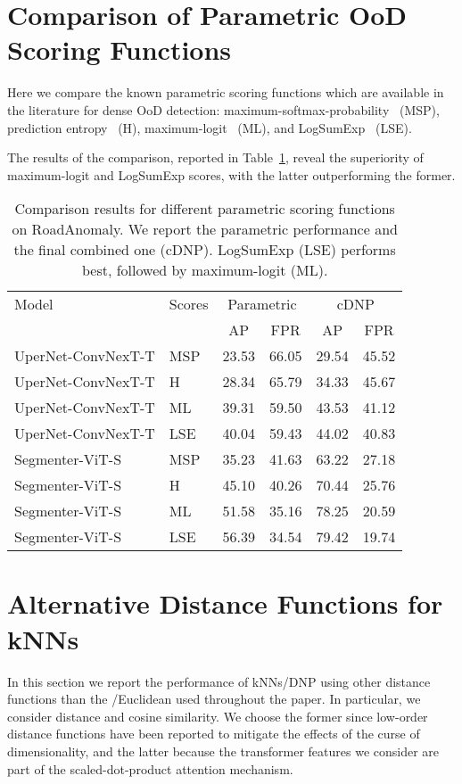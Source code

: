 \documentclass[10pt,twocolumn,letterpaper]{article}
\begin{document}
\section{Comparison of Parametric OoD Scoring Functions}
Here we compare the known parametric scoring functions which are available in the literature for dense OoD detection: maximum-softmax-probability~\cite{hendrycks2017a} (MSP), prediction entropy~\cite{hendrycks2019benchmark} (H), maximum-logit~\cite{hendrycks2019benchmark} (ML), and LogSumExp~\cite{Grathwohl2020Your,Tian2021} (LSE).

The results of the comparison, reported in Table~\ref{tab:parametric_scores}, reveal the superiority of maximum-logit and LogSumExp scores, with the latter outperforming the former.

\begin{table}
    \centering
    \scriptsize
    \begin{tabular}{l|l|c|c|c|c}
    \toprule
    Model & Scores & \multicolumn{2}{c|}{Parametric} & \multicolumn{2}{c}{cDNP} \\
    & & AP & FPR & AP & FPR \\
    \midrule
    UperNet-ConvNexT-T & MSP &  23.53 & 66.05 & 29.54 & 45.52 \\
    UperNet-ConvNexT-T & H &   28.34 & 65.79 & 34.33 & 45.67 \\
    UperNet-ConvNexT-T & ML &   39.31 & 59.50 & 43.53 & 41.12\\
    UperNet-ConvNexT-T & LSE &  40.04 & 59.43 & 44.02 & 40.83\\
    \midrule
    Segmenter-ViT-S & MSP &  35.23 & 41.63 & 63.22 & 27.18\\
    Segmenter-ViT-S & H &  45.10 & 40.26 & 70.44 & 25.76\\
    Segmenter-ViT-S & ML &  51.58 & 35.16 & 78.25 & 20.59\\
    Segmenter-ViT-S & LSE &  56.39 & 34.54 & 79.42 & 19.74\\
    \bottomrule
    \end{tabular}
    \caption{Comparison results for different parametric scoring functions on RoadAnomaly. We report the parametric performance and the final combined one (cDNP). LogSumExp (LSE) performs best, followed by maximum-logit (ML).}
    \label{tab:parametric_scores}
\end{table}

\section{Alternative Distance Functions for kNNs}
In this section we report the performance of kNNs/DNP using other distance functions than the /Euclidean used throughout the paper. In particular, we consider  distance and cosine similarity. We choose the former since low-order distance functions have been reported to mitigate the effects of the curse of dimensionality, and the latter because the transformer features we consider are part of the scaled-dot-product attention mechanism.
\end{document}
